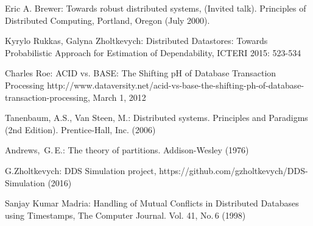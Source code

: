 \documentclass{llncs}
\begin{document}
\begin{thebibliography}{00}
Eric A. Brewer:
Towards robust distributed systems,
(Invited talk). Principles of Distributed Computing, Portland, Oregon (July 2000).

Kyrylo Rukkas, Galyna Zholtkevych:
Distributed Datastores: Towards Probabilistic Approach for Estimation of Dependability,
ICTERI 2015: 523-534

Charles Roe:
ACID vs. BASE: The Shifting pH of Database Transaction Processing
http://www.dataversity.net/acid-vs-base-the-shifting-ph-of-database-transaction-processing, March 1, 2012

Tanenbaum, A.S., Van Steen, M.:
Distributed systems. Principles and Paradigms (2nd Edition).
Prentice-Hall, Inc. (2006)

Andrews,~G.\,E.:
The theory of partitions.
Addison-Wesley (1976)


G.Zholtkevych: 
DDS Simulation project,
https://github.com/gzholtkevych/DDS-Simulation (2016) 

Sanjay Kumar Madria: 
Handling of Mutual Conflicts in Distributed Databases using Timestamps,
The Computer Journal. Vol. 41, No.\,6 (1998) 

\end{thebibliography}
\end{document}
